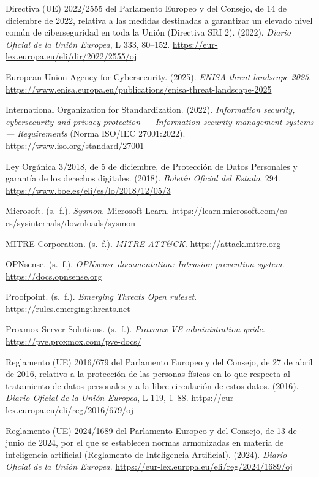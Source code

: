 \documentclass[11pt,a4paper,oneside]{report}
\begin{document}
\begin{list}{}{\leftmargin=1.27cm \itemindent=-1.27cm \itemsep=6pt}
  \item Directiva (UE) 2022/2555 del Parlamento Europeo y del Consejo, de 14 de diciembre de 2022, relativa a las medidas destinadas a garantizar un elevado nivel común de ciberseguridad en toda la Unión (Directiva SRI 2). (2022). \textit{Diario Oficial de la Unión Europea}, L 333, 80--152. \url{https://eur-lex.europa.eu/eli/dir/2022/2555/oj}
  \item European Union Agency for Cybersecurity. (2025). \textit{ENISA threat landscape 2025}. \url{https://www.enisa.europa.eu/publications/enisa-threat-landscape-2025}
  \item International Organization for Standardization. (2022). \textit{Information security, cybersecurity and privacy protection --- Information security management systems --- Requirements} (Norma ISO/IEC 27001:2022). \url{https://www.iso.org/standard/27001}
  \item Ley Orgánica 3/2018, de 5 de diciembre, de Protección de Datos Personales y garantía de los derechos digitales. (2018). \textit{Boletín Oficial del Estado}, 294. \url{https://www.boe.es/eli/es/lo/2018/12/05/3}
  \item Microsoft. (s.~f.). \textit{Sysmon}. Microsoft Learn. \url{https://learn.microsoft.com/es-es/sysinternals/downloads/sysmon}
  \item MITRE Corporation. (s.~f.). \textit{MITRE ATT\&CK}. \url{https://attack.mitre.org}
  \item OPNsense. (s.~f.). \textit{OPNsense documentation: Intrusion prevention system}. \url{https://docs.opnsense.org}
  \item Proofpoint. (s.~f.). \textit{Emerging Threats Open ruleset}. \url{https://rules.emergingthreats.net}
  \item Proxmox Server Solutions. (s.~f.). \textit{Proxmox VE administration guide}. \url{https://pve.proxmox.com/pve-docs/}
  \item Reglamento (UE) 2016/679 del Parlamento Europeo y del Consejo, de 27 de abril de 2016, relativo a la protección de las personas físicas en lo que respecta al tratamiento de datos personales y a la libre circulación de estos datos. (2016). \textit{Diario Oficial de la Unión Europea}, L 119, 1--88. \url{https://eur-lex.europa.eu/eli/reg/2016/679/oj}
  \item Reglamento (UE) 2024/1689 del Parlamento Europeo y del Consejo, de 13 de junio de 2024, por el que se establecen normas armonizadas en materia de inteligencia artificial (Reglamento de Inteligencia Artificial). (2024). \textit{Diario Oficial de la Unión Europea}. \url{https://eur-lex.europa.eu/eli/reg/2024/1689/oj}

\end{list}
\end{document}
